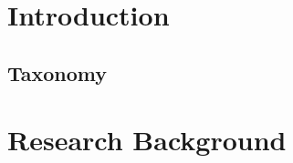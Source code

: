 \chapter{Introduction}

\section{Taxonomy} \label{secSupplyChainTaxonomy}

\chapter{Research Background}




